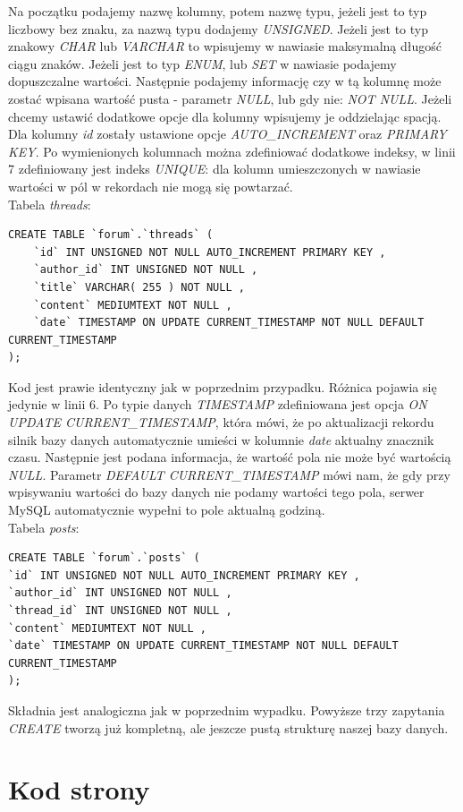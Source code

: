 \documentclass[a4paper,10pt]{article}
\begin{document}
Na początku podajemy nazwę kolumny, potem nazwę typu, jeżeli jest to typ liczbowy bez znaku, za nazwą typu dodajemy \textit{UNSIGNED}. Jeżeli jest to typ znakowy \textit{CHAR} lub \textit{VARCHAR} to wpisujemy w nawiasie maksymalną długość ciągu znaków. Jeżeli jest to typ \textit{ENUM}, lub \textit{SET} w nawiasie podajemy dopuszczalne wartości. Następnie podajemy informację czy w tą kolumnę może zostać wpisana wartość pusta - parametr \textit{NULL}, lub gdy nie: \textit{NOT NULL}. Jeżeli chcemy ustawić dodatkowe opcje dla kolumny wpisujemy je oddzielając spacją. Dla kolumny \textit{id} zostały ustawione opcje \textit{AUTO\_INCREMENT} oraz \textit{PRIMARY KEY}. Po wymienionych kolumnach można zdefiniować dodatkowe indeksy, w linii 7 zdefiniowany jest indeks \textit{UNIQUE}: dla kolumn umieszczonych w nawiasie wartości w pól w rekordach nie mogą się powtarzać. \\
Tabela \textit{threads}: \\
\begin{verbatim}
CREATE TABLE `forum`.`threads` (
	`id` INT UNSIGNED NOT NULL AUTO_INCREMENT PRIMARY KEY ,
	`author_id` INT UNSIGNED NOT NULL ,
	`title` VARCHAR( 255 ) NOT NULL ,
	`content` MEDIUMTEXT NOT NULL ,
	`date` TIMESTAMP ON UPDATE CURRENT_TIMESTAMP NOT NULL DEFAULT CURRENT_TIMESTAMP 
);
\end{verbatim}
Kod jest prawie identyczny jak w poprzednim przypadku. Różnica pojawia się jedynie w linii 6. Po typie danych \textit{TIMESTAMP} zdefiniowana jest opcja \textit{ON UPDATE CURRENT\_TIMESTAMP}, która mówi, że po aktualizacji rekordu silnik bazy danych automatycznie umieści w kolumnie \textit{date} aktualny znacznik czasu. Następnie jest podana informacja, że wartość pola nie może być wartością \textit{NULL}. Parametr \textit{DEFAULT CURRENT\_TIMESTAMP} mówi nam, że gdy przy wpisywaniu wartości do bazy danych nie podamy wartości tego pola, serwer MySQL automatycznie wypełni to pole aktualną godziną. \\
Tabela \textit{posts}: \\
\begin{verbatim}
CREATE TABLE `forum`.`posts` (
`id` INT UNSIGNED NOT NULL AUTO_INCREMENT PRIMARY KEY ,
`author_id` INT UNSIGNED NOT NULL ,
`thread_id` INT UNSIGNED NOT NULL ,
`content` MEDIUMTEXT NOT NULL ,
`date` TIMESTAMP ON UPDATE CURRENT_TIMESTAMP NOT NULL DEFAULT CURRENT_TIMESTAMP 
);
\end{verbatim}
Składnia jest analogiczna jak w poprzednim wypadku. Powyższe trzy zapytania \textit{CREATE} tworzą już kompletną, ale jeszcze pustą strukturę naszej bazy danych.
\section{Kod strony}
\end{document}
